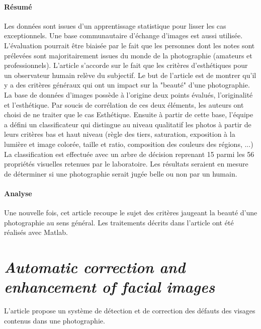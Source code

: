 \documentclass[11pt, french]{report-rd-info}
\begin{document}
\paragraph{Résumé}
Les données sont issues d'un apprentissage statistique pour lisser les cas exceptionnels. Une base communautaire d'échange d'images est aussi utilisée. L'évaluation pourrait être biaisée par le fait que les personnes dont les notes sont prélevées sont majoritairement issues du monde de la photographie (amateurs et professionnels). L'article s'accorde sur le fait que les critères d'esthétiques pour un observateur humain relève du subjectif. Le but de l'article est de montrer qu'il y a des critères généraux qui ont un impact sur la "beauté" d'une photographie. La base de données d'images possède à l'origine deux points évalués, l'originalité et l'esthétique. Par soucis de corrélation de ces deux éléments, les auteurs ont choisi de ne traiter que le cas Esthétique.
Ensuite à partir de cette base, l'équipe a défini un classificateur qui distingue au niveau qualitatif les photos à partir de leurs critères bas et haut niveau (règle des tiers, saturation, exposition à la lumière et image colorée, taille et ratio, composition des couleurs des régions, ...)
La classification est effectuée avec un arbre de décision reprenant 15 parmi les 56 propriétés visuelles retenues par le laboratoire. Les résultats seraient en mesure de déterminer si une photographie serait jugée belle ou non par un humain.

\paragraph{Analyse}
Une nouvelle fois, cet article recoupe le sujet des critères jaugeant la beauté d'une photographie au sens général. Les traitements décrits dans l’article ont été réalisés avec Matlab.


\section{\emph{Automatic correction and enhancement of facial images}}
L'article \cite{Konoplev2012} propose un système de détection et de correction des défauts des visages contenus dans une photographie.
\end{document}

